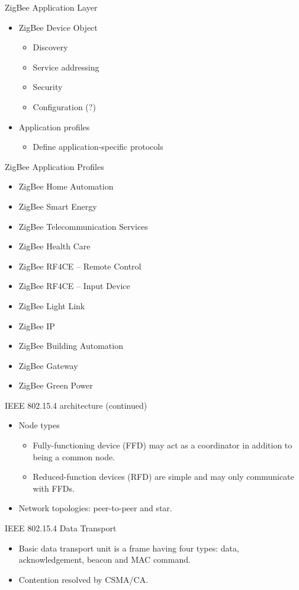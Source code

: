 \documentclass{beamer}
\begin{document}
\begin{frame}{ZigBee Application Layer}
  \begin{itemize}
  	\item ZigBee Device Object
  	\begin{itemize}
  		\item Discovery
  		\item Service addressing
  		\item Security
  		\item Configuration (?)
  	\end{itemize}
  	\item Application profiles
  	\begin{itemize}
  		\item Define application-specific protocols 
  	\end{itemize}
  \end{itemize}
\end{frame}

\begin{frame}{ZigBee Application Profiles}
  \begin{itemize}
  	\item ZigBee Home Automation
    \item ZigBee Smart Energy
    \item ZigBee Telecommunication Services
    \item ZigBee Health Care
    \item ZigBee RF4CE – Remote Control
    \item ZigBee RF4CE – Input Device
    \item ZigBee Light Link
    \item ZigBee IP
    \item ZigBee Building Automation
    \item ZigBee Gateway
    \item ZigBee Green Power
  \end{itemize}
\end{frame}

\begin{frame}{IEEE 802.15.4 architecture (continued)}
  \begin{itemize}
    \item Node types  
      \begin{itemize}
      \item Fully-functioning device (FFD) may act as a coordinator in addition
      to being a common node. 
      \item Reduced-function devices (RFD) are simple and may only communicate
      with FFDs.
    \end{itemize}
    \item Network topologies: peer-to-peer and star.
  \end{itemize}
\end{frame}

\begin{frame}{IEEE 802.15.4 Data Transport}
  \begin{itemize}
    \item Basic data transport unit is a frame having four types: data, 
    acknowledgement, beacon and MAC command.
    \item Contention resolved by CSMA/CA.
  \end{itemize}
\end{frame}
\end{document}
